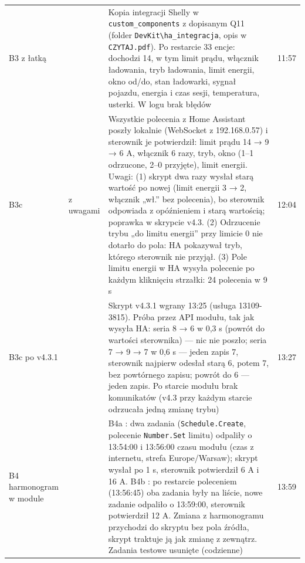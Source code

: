 \documentclass[11pt,a4paper]{article}
\begin{document}
\begin{longtable}{>{\raggedright\arraybackslash}p{3.00cm}>{\raggedright\arraybackslash}p{2.62cm}>{\raggedright\arraybackslash}p{7.10cm}>{\raggedright\arraybackslash}p{2.11cm}}
B3 z łatką & \leavevmode{\symbolfont\color{apgreen}\textbf{✔}} & Kopia integracji Shelly w \texttt{custom\_\allowbreak{}components} z dopisanym Q11 (folder \texttt{DevKit\textbackslash{}ha\_\allowbreak{}integracja}, opis w \texttt{CZYTAJ.pdf}). Po restarcie 33 encje: dochodzi 14, w tym limit prądu, włącznik ładowania, tryb ładowania, limit energii, okno od/do, stan ładowarki, sygnał pojazdu, energia i czas sesji, temperatura, usterki. W logu brak błędów & 29.09 11:57 \\
B3c & \leavevmode{\symbolfont\color{apgreen}\textbf{✔}} z uwagami & Wszystkie polecenia z Home Assistant poszły lokalnie (WebSocket z 192.168.0.57) i sterownik je potwierdził: limit prądu 14 {\symbolfont→} 9 {\symbolfont→} 6 A, włącznik 6 razy, tryb, okno (1–1 odrzucone, 2–0 przyjęte), limit energii. Uwagi: (1) skrypt dwa razy wysłał starą wartość po nowej (limit energii 3 {\symbolfont→} 2, włącznik „wł.” bez polecenia), bo sterownik odpowiada z opóźnieniem i starą wartością; poprawka w skrypcie v4.3. (2) Odrzucenie trybu „do limitu energii” przy limicie 0 nie dotarło do pola: HA pokazywał tryb, którego sterownik nie przyjął. (3) Pole limitu energii w HA wysyła polecenie po każdym kliknięciu strzałki: 24 polecenia w 9 s & 29.09 12:04 \\
B3c po v4.3.1 & \leavevmode{\symbolfont\color{apgreen}\textbf{✔}} & Skrypt v4.3.1 wgrany 13:25 (usługa 13109-3815). Próba przez API modułu, tak jak wysyła HA: seria 8 {\symbolfont→} 6 w 0,3 s (powrót do wartości sterownika) — nic nie poszło; seria 7 {\symbolfont→} 9 {\symbolfont→} 7 w 0,6 s — jeden zapis 7, sterownik najpierw odesłał starą 6, potem 7, bez powtórnego zapisu; powrót do 6 — jeden zapis. Po starcie modułu brak komunikatów (v4.3 przy każdym starcie odrzucała jedną zmianę trybu) & 29.09 13:27 \\
B4 harmonogram w module & \leavevmode{\symbolfont\color{apgreen}\textbf{✔}} & B4a \leavevmode{\symbolfont\color{apgreen}\textbf{✔}}: dwa zadania (\texttt{Schedule.\allowbreak{}Create}, polecenie \texttt{Number.Set} limitu) odpaliły o 13:54:00 i 13:56:00 czasu modułu (czas z internetu, strefa Europe/Warsaw); skrypt wysłał po 1 s, sterownik potwierdził 6 A i 16 A. B4b \leavevmode{\symbolfont\color{apgreen}\textbf{✔}}: po restarcie poleceniem (13:56:45) oba zadania były na liście, nowe zadanie odpaliło o 13:59:00, sterownik potwierdził 12 A. Zmiana z harmonogramu przychodzi do skryptu bez pola źródła, skrypt traktuje ją jak zmianę z zewnątrz. Zadania testowe usunięte (codzienne) & 29.09 13:59 \\

\end{longtable}
\end{document}
